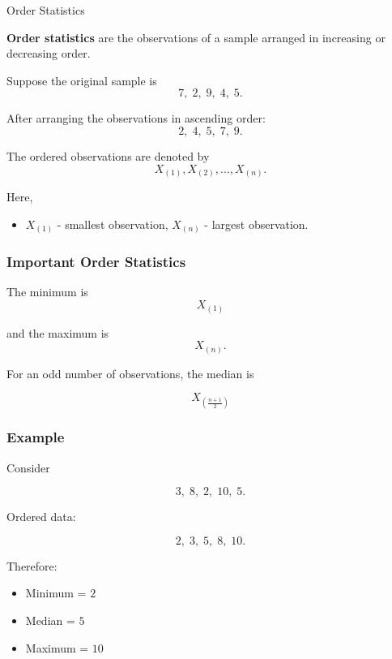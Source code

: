 \documentclass[aspectratio=169]{beamer}
\begin{document}
\begin{frame}{Order Statistics}


\textbf{Order statistics} are the observations of a sample arranged in
increasing or decreasing order.

Suppose the original sample is
\vspace{0.0 cm}
\[
7,\;2,\;9,\;4,\;5.
\]

After arranging the observations in ascending order:
\vspace{0.0 cm}
\[
2,\;4,\;5,\;7,\;9.
\]

The ordered observations are denoted by
\vspace{0.0 cm}
\[
X_{(1)},X_{(2)},\ldots,X_{(n)}.
\]

Here,

\begin{itemize}
    \item $X_{(1)}$ - smallest observation, $X_{(n)}$ - largest observation.
\end{itemize}

\subsubsection*{Important Order Statistics}

The minimum is
\vspace{0.0 cm}
\[
\boxed{X_{(1)}}
\]

and the maximum is
\vspace{0.0 cm}
\[
\boxed{X_{(n)}}.
\]
\end{frame}
\begin{frame}
For an odd number of observations, the median is

\[
\boxed{
X_{\left(\frac{n+1}{2}\right)}
}
\]


\subsubsection*{Example}

Consider

\[
3,\;8,\;2,\;10,\;5.
\]

Ordered data:

\[
2,\;3,\;5,\;8,\;10.
\]

Therefore:

\begin{itemize}
    \item Minimum = $2$
    \item Median = $5$
    \item Maximum = $10$
\end{itemize}
\end{frame}
\end{document}
